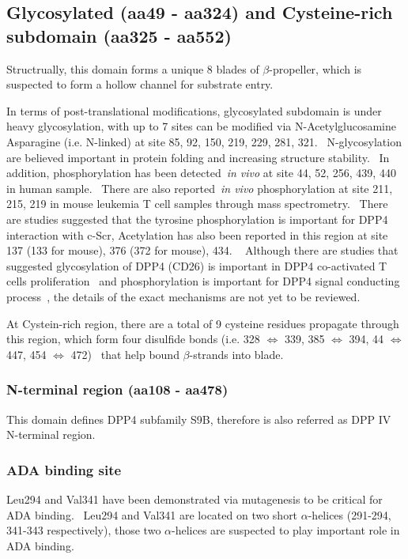 \subsection{Glycosylated (aa49 - aa324) and Cysteine-rich subdomain (aa325 - aa552)}

Structrually, this domain forms a unique 8 blades of $\beta$-propeller, which is suspected to form a hollow channel for substrate entry.

In terms of post-translational modifications, glycosylated subdomain is under heavy glycosylation, with up to 7 sites can be modified via N-Acetylglucosamine Asparagine (i.e. N-linked) at site 85, 92, 150, 219, 229, 281, 321.~\cite{Rasmussen2003,Thoma2003,Meng2010,Chen2009,Hiramatsu2003} N-glycosylation are believed important in protein folding and increasing structure stability.~\cite{Fan_1997} In addition, phosphorylation has been detected~\textit{in vivo} at site 44, 52, 256, 439, 440 in human sample.~\cite{Xia2008, Hornbeck2015, Mertins2014} There are also reported~\textit{in vivo} phosphorylation at site 211, 215, 219 in mouse leukemia T cell samples through mass spectrometry.~\cite{Hornbeck2015} There are studies suggested that the tyrosine phosphorylation is important for DPP4 interaction with  c-Scr, 
Acetylation has also been reported in this region at site 137 (133 for mouse), 376 (372 for mouse), 434. ~\cite{Lundby2012,Weinert2013} Although there are studies that suggested glycosylation of DPP4 (CD26) is important in DPP4 co-activated T cells proliferation~\cite{Ikushima_2000} and phosphorylation is important for DPP4 signal conducting process~\cite{Ishii_2001}, the details of the exact mechanisms are not yet to be reviewed.
\par
At Cystein-rich region, there are a total of 9 cysteine residues propagate through this region, which form four disulfide bonds (i.e. 328 $\Leftrightarrow$ 339, 385 $\Leftrightarrow$ 394, 44 $\Leftrightarrow$ 447, 454 $\Leftrightarrow$ 472)~\cite{Hiramatsu2003} that help bound $\beta$-strands into blade. 

\subsubsection{N-terminal region (aa108 - aa478)}

This domain defines DPP4 subfamily S9B, therefore is also referred as DPP IV N-terminal region. 

\subsubsection{ADA binding site}
Leu294 and Val341 have been demonstrated via mutagenesis to be critical for ADA binding.~\cite{Abbott_1999} Leu294 and Val341 are located on two short $\alpha$-helices (291-294, 341-343 respectively), those two $\alpha$-helices are suspected to play important role in ADA binding. 